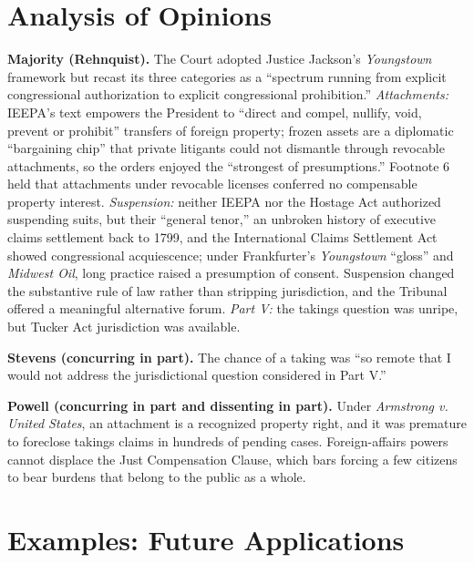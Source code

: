 \documentclass[12pt]{article}
\begin{document}
\section{Analysis of Opinions}

\textbf{Majority (Rehnquist).} The Court adopted Justice Jackson's \textit{Youngstown} framework but recast its three categories as a ``spectrum running from explicit congressional authorization to explicit congressional prohibition.'' \emph{Attachments:} IEEPA's text empowers the President to ``direct and compel, nullify, void, prevent or prohibit'' transfers of foreign property; frozen assets are a diplomatic ``bargaining chip'' that private litigants could not dismantle through revocable attachments, so the orders enjoyed the ``strongest of presumptions.'' Footnote 6 held that attachments under revocable licenses conferred no compensable property interest. \emph{Suspension:} neither IEEPA nor the Hostage Act authorized suspending suits, but their ``general tenor,'' an unbroken history of executive claims settlement back to 1799, and the International Claims Settlement Act showed congressional acquiescence; under Frankfurter's \textit{Youngstown} ``gloss'' and \textit{Midwest Oil}, long practice raised a presumption of consent. Suspension changed the substantive rule of law rather than stripping jurisdiction, and the Tribunal offered a meaningful alternative forum. \emph{Part V:} the takings question was unripe, but Tucker Act jurisdiction was available.

\textbf{Stevens (concurring in part).} The chance of a taking was ``so remote that I would not address the jurisdictional question considered in Part V.''

\textbf{Powell (concurring in part and dissenting in part).} Under \textit{Armstrong v. United States}, an attachment is a recognized property right, and it was premature to foreclose takings claims in hundreds of pending cases. Foreign-affairs powers cannot displace the Just Compensation Clause, which bars forcing a few citizens to bear burdens that belong to the public as a whole.

\section{Examples: Future Applications}
\end{document}
